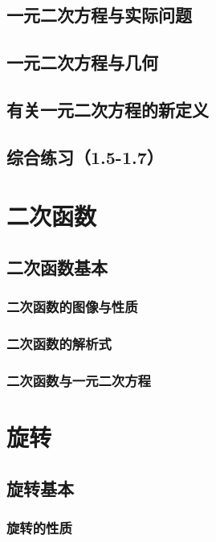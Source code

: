 \documentclass[lang=cn, 10pt, titlestyle=hang, oneside]{elegantbook}
\begin{document}
\section{一元二次方程与实际问题}

\section{一元二次方程与几何}

\section{有关一元二次方程的新定义}

\section{综合练习（1.5-1.7）}

\chapter{二次函数}

\section{二次函数基本}

\subsection{二次函数的图像与性质}

\subsection{二次函数的解析式}

\subsection{二次函数与一元二次方程}

\chapter{旋转}

\section{旋转基本}

\subsection{旋转的性质}
\end{document}
